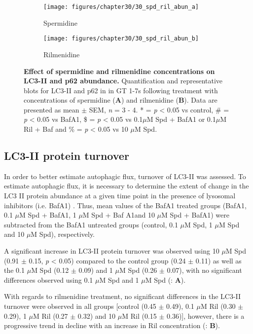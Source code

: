 {\begin{landscape}
\begin{figure}[!htbp]
  \centering
  \begin{subfigure}[b]{0.35\linewidth}
    \texttt{[image: figures/chapter30/30\_spd\_ril\_abun\_a]}
    \caption{Spermidine}
  \end{subfigure}
  \begin{subfigure}[b]{0.35\linewidth}
    \texttt{[image: figures/chapter30/30\_spd\_ril\_abun\_b]}
    \caption{Rilmenidine}
  \end{subfigure}
  \caption[Effect of spermidine and rilmenidine concentrations on LC3-II and p62 abundance]{\textbf{Effect of spermidine and rilmenidine concentrations on LC3-II and p62 abundance.} Quantification and representative blots for LC3-II and p62 in in GT 1-7s following treatment with concentrations of spermidine (\textbf{A}) and rilmenidine (\textbf{B}). Data are presented as mean $\pm$ SEM, \textit{n} = 3 - 4. * = \textit{p} < 0.05 vs control, \# = \textit{p} < 0.05 vs BafA1, \$ = \textit{p} < 0.05 vs 0.1$\mu$M Spd + BafA1 or 0.1$\mu$M Ril + Baf and \% = \textit{p} < 0.05 vs 10 $\mu$M Spd.}
  \label{fig:30_spd_ril_abun_a}
\end{figure}
\end{landscape}

\subsection{LC3-II protein turnover}
In order to better estimate autophagic flux, turnover of LC3-II was assessed. To estimate autophagic flux, it is necessary to determine the extent of change in the LC3 II protein abundance at a given time point in the presence of lysosomal inhibitors (i.e. BafA1) \citep{Martinez-Lopez2013}. Thus, mean values of the BafA1 treated groups (BafA1, 0.1 $\mu$M Spd + BafA1, 1 $\mu$M Spd + Baf A1and 10 $\mu$M Spd + BafA1) were subtracted from the BafA1 untreated groups (control, 0.1 $\mu$M Spd, 1 $\mu$M Spd and 10 $\mu$M Spd), respectively.

A significant increase in LC3-II protein turnover was observed using 10 $\mu$M Spd (0.91 $\pm$ 0.15, \textit{p} < 0.05) compared to the control group (0.24 $\pm$ 0.11) as well as the 0.1 $\mu$M Spd (0.12 $\pm$ 0.09) and 1 $\mu$M Spd (0.26 $\pm$ 0.07), with no significant differences observed using 0.1 $\mu$M Spd  and 1 $\mu$M Spd (: \textbf{A}). 

With regards to rilmenidine treatment, no significant differences in the LC3-II turnover were observed in all groups [control (0.45 $\pm$ 0.49), 0.1 $\mu$M Ril (0.30 $\pm$ 0.29), 1 $\mu$M Ril (0.27 $\pm$ 0.32) and 10 $\mu$M Ril (0.15 $\pm$ 0.36)], however, there is a progressive trend in decline with an increase in Ril concentration (: \textbf{B}). 

}

